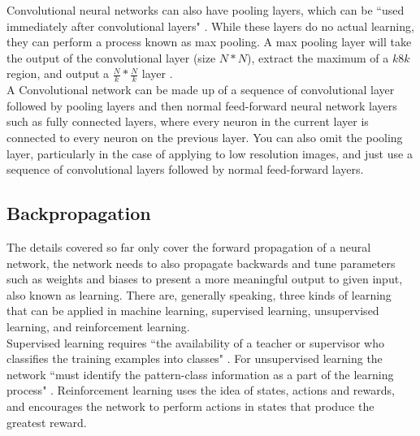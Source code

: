 \documentclass[10pt]{article}
\begin{document}
		Convolutional neural networks can also have pooling layers, which can be ``used immediately after convolutional layers" \cite{nndl}. While these layers do no actual learning, they can perform a process known as max pooling. A max pooling layer will take the output of the convolutional layer (size $N*N$), extract the maximum of a $k8k$ region, and output a $\frac{N}{k} * \frac{N}{k}$ layer \cite{convNN}.\\
		
		A Convolutional network can be made up of a sequence of convolutional layer followed by pooling layers and then normal feed-forward neural network layers such as fully connected layers, where every neuron in the current layer is connected to every neuron on the previous layer. You can also omit the pooling layer, particularly in the case of applying to low resolution images, and just use a sequence of convolutional layers followed by normal feed-forward layers.\\
		
		\subsection{Backpropagation}
		
		The details covered so far only cover the forward propagation of a neural network, the network needs to also propagate backwards and tune parameters such as weights and biases to present a more meaningful output to given input, also known as learning. There are, generally speaking, three kinds of learning that can be applied in machine learning, supervised learning, unsupervised learning, and reinforcement learning.\\
		 Supervised learning requires ``the availability of a teacher or supervisor who classifies the training examples into classes" \cite{nnintell}. For unsupervised learning the network ``must identify the pattern-class information as a part of the learning process" \cite{nnintell}. Reinforcement learning uses the idea of states, actions and rewards, and encourages the network to perform actions in states that produce the greatest reward.\\
		 
\end{document}

